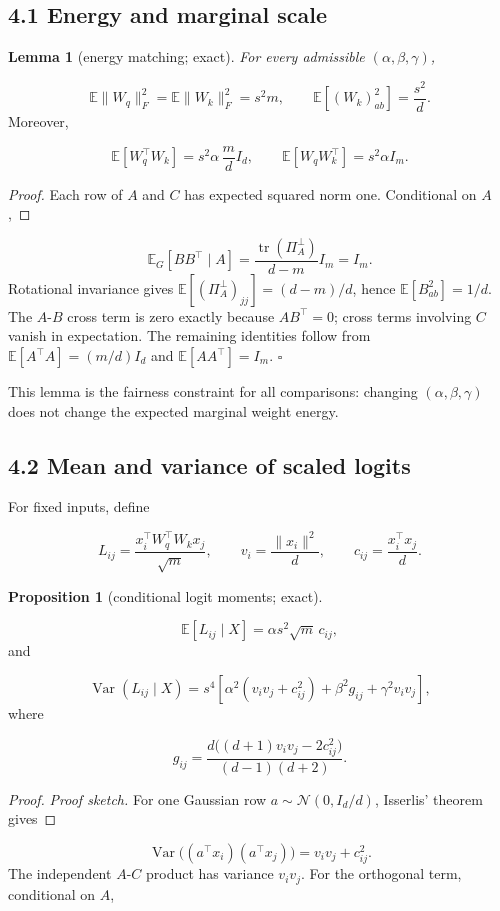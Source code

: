 \documentclass[11pt,letterpaper]{article}
\newtheorem{lemma}{Lemma}[section]
\newtheorem{proposition}{Proposition}[section]
\theoremstyle{definition}
\begin{document}
\subsection{4.1 Energy and marginal scale}
\begin{lemma}[energy matching; exact]
For every admissible $(\alpha,\beta,\gamma)$,
\end{lemma}
\[
\mathbb E\|W_q\|_F^2=\mathbb E\|W_k\|_F^2=s^2m,
\qquad
\mathbb E[(W_k)_{ab}^2]=\frac{s^2}{d}.
\]
Moreover,

\[
\mathbb E[W_q^\top W_k]=s^2\alpha\,\frac md I_d,
\qquad
\mathbb E[W_qW_k^\top]=s^2\alpha I_m.
\]
\begin{proof}
Each row of $A$ and $C$ has expected squared norm one. Conditional on $A$,
\end{proof}
\[
\mathbb E_G[BB^\top\mid A]
=\frac{\operatorname{tr}(\Pi_A^\perp)}{d-m}I_m=I_m.
\]
Rotational invariance gives $\mathbb E[(\Pi_A^\perp)_{jj}]=(d-m)/d$, hence $\mathbb E[B_{ab}^2]=1/d$. The $A$-$B$ cross term is zero exactly because $AB^\top=0$; cross terms involving $C$ vanish in expectation. The remaining identities follow from $\mathbb E[A^\top A]=(m/d)I_d$ and $\mathbb E[AA^\top]=I_m$. $\square$

This lemma is the fairness constraint for all comparisons: changing $(\alpha,\beta,\gamma)$ does not change the expected marginal weight energy.

\subsection{4.2 Mean and variance of scaled logits}
For fixed inputs, define

\[
L_{ij}=\frac{x_i^\top W_q^\top W_kx_j}{\sqrt m},
\qquad v_i=\frac{\|x_i\|^2}{d},\qquad c_{ij}=\frac{x_i^\top x_j}{d}.
\]
\begin{proposition}[conditional logit moments; exact]
\end{proposition}
\[
\mathbb E[L_{ij}\mid X]=\alpha s^2\sqrt m\,c_{ij},
\]
and

\[
\operatorname{Var}(L_{ij}\mid X)
=s^4\!\left[
\alpha^2(v_iv_j+c_{ij}^2)
+\beta^2 g_{ij}
+\gamma^2v_iv_j
\right],
\]
where

\[
g_{ij}
=\frac{d\big((d+1)v_iv_j-2c_{ij}^2\big)}
{(d-1)(d+2)}.
\]
\begin{proof}
\textit{Proof sketch.} For one Gaussian row $a\sim\mathcal N(0,I_d/d)$, Isserlis' theorem gives
\end{proof}
\[
\operatorname{Var}\big((a^\top x_i)(a^\top x_j)\big)
=v_iv_j+c_{ij}^2.
\]
The independent $A$-$C$ product has variance $v_iv_j$. For the orthogonal term, conditional on $A$,
\end{document}
